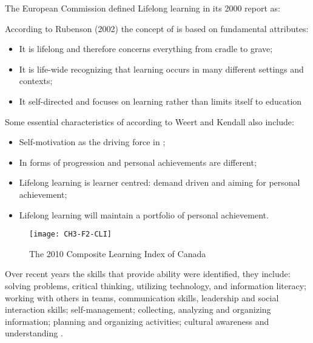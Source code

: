 The European Commission defined Lifelong learning in its 2000 report
\citep{EuropeanCommission2000} as:


According to Rubenson (2002) the concept of \LLLs is based on fundamental
attributes:

\begin{itemize}
  \item It is lifelong and therefore concerns everything from cradle to grave;
  \item It is life-wide recognizing that learning occurs in many different
  settings and contexts;
  \item It self-directed and focuses on learning rather than limits itself to
education
\end{itemize} 

Some essential characteristics of \LLLs according to Weert and Kendall
\citeyearpar{Weert2004} also include:

\begin{itemize}
  \item Self-motivation as the driving force in \LLLsn;
  \item In \LLLs forms of progression and personal achievements are
  different;
  \item Lifelong learning is learner centred: demand driven and aiming for
  personal achievement;
  \item Lifelong learning will maintain a portfolio of personal achievement.
\end{itemize} 

\begin{figure}[htb]
\centering
\texttt{[image: CH3-F2-CLI]}
\caption{The 2010 Composite Learning Index of Canada}
\label{fig:cli2010}
\end{figure}

Over recent years the skills that provide \LLLs ability were
identified, they include: solving problems, critical thinking, utilizing
technology, and information literacy; working with others in teams,
communication skills, leadership and social interaction skills; self-management;
collecting, analyzing and organizing information; planning and organizing
activities; cultural awareness and understanding
\citep{Brooks2008,Heinrich2007,Otala1997,Pitman2009}.

